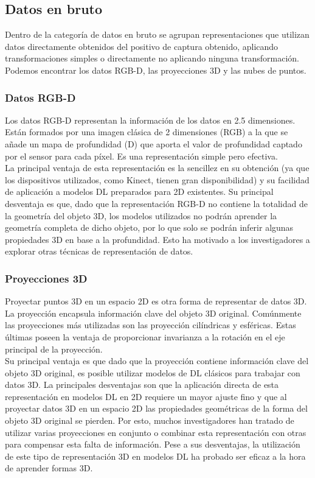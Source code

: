 \subsection{Datos en bruto}
Dentro de la categoría de datos en bruto se agrupan representaciones que utilizan datos directamente obtenidos del positivo de captura obtenido, aplicando transformaciones simples o directamente no aplicando ninguna transformación. Podemos encontrar los datos RGB-D, las proyecciones 3D y las nubes de puntos. %

\subsubsection{Datos RGB-D}
Los datos RGB-D representan la información de los datos en 2.5 dimensiones. Están formados por una imagen clásica de 2 dimensiones (RGB) a la que se añade un mapa de profundidad (D) que aporta el valor de profundidad captado por el sensor para cada píxel. Es una representación simple pero efectiva. 
\\

La principal ventaja de esta representación es la sencillez en su obtención (ya que los dispositivos utilizados, como Kinect, tienen gran disponibilidad) y su facilidad de aplicación a modelos DL preparados para 2D existentes. Su principal desventaja es que, dado que la representación RGB-D no contiene la totalidad de la geometría del objeto 3D, los modelos utilizados no podrán aprender la geometría completa de dicho objeto, por lo que solo se podrán inferir algunas propiedades 3D en base a la profundidad. Esto ha motivado a los investigadores a explorar otras técnicas de representación de datos. 

\subsubsection{Proyecciones 3D}
Proyectar puntos 3D en un espacio 2D es otra forma de representar de datos 3D. La proyección encapsula información clave del objeto 3D original. Comúnmente las proyecciones más utilizadas son las proyección cilíndricas y esféricas. Estas últimas poseen la ventaja de proporcionar invarianza a la rotación en el eje principal de la proyección. 
\\

Su principal ventaja es que dado que la proyección contiene información clave del objeto 3D original, es posible utilizar modelos de DL clásicos para trabajar con datos 3D. La principales desventajas son que la aplicación directa de esta representación en modelos DL en 2D requiere un mayor ajuste fino y que al proyectar datos 3D en un espacio 2D las propiedades geométricas de la forma del objeto 3D original se pierden. Por esto, muchos investigadores han tratado de utilizar varias proyecciones en conjunto o combinar esta representación con otras para compensar esta falta de información. Pese a sus desventajas, la utilización de este tipo de representación 3D en modelos DL ha probado ser eficaz a la hora de aprender formas 3D. 

